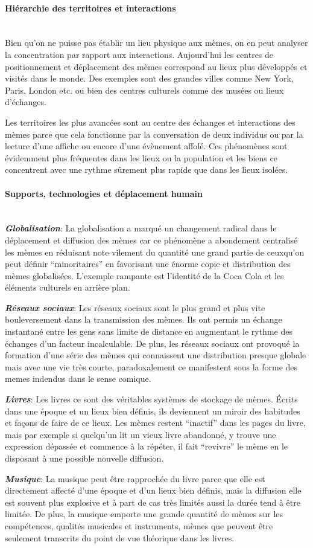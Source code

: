 \documentclass[12pt]{article}
\newcommand{\myparagraph}[1]{\paragraph{#1}\mbox{}\\}
\begin{document}
\myparagraph{Hiérarchie des territoires et interactions}
Bien qu'on ne puisse pas établir un lieu physique aux mèmes, on en peut
analyser la concentration par rapport aux interactions. Aujourd'hui les
centres de positionnement et déplacement des mèmes correspond au lieux
plus développés et visités dans le monde. Des exemples sont des grandes
villes comme New York, Paris, London etc. ou bien des centres culturels
comme des musées ou lieux d'échanges.

Les territoires les plus avancées sont au centre des échanges et
interactions des mèmes parce que cela fonctionne par la conversation de
deux individus ou par la lecture d'une affiche ou encore d'une évènement
affolé. Ces phénomènes sont évidemment plus fréquentes dans les lieux ou
la population et les biens ce concentrent avec une rythme sûrement plus
rapide que dans les lieux isolées.


\myparagraph{Supports, technologies et déplacement humain}

\emph{\textbf{Globalisation}}: La globalisation a marqué un changement
radical dans le déplacement et diffusion des mèmes car ce phénomène a
abondement centralisé les mèmes en réduisant note vilement du quantité
une grand partie de ceuxqu'on peut définir ``minoritaires'' en
favorisant une énorme copie et distribution des mèmes globalisées.
L'exemple rampante est l'identité de la Coca Cola et les éléments
culturels en arrière plan.

\emph{\textbf{Réseaux sociaux}}: Les réseaux sociaux sont le plus grand
et plus vite bouleversement dans la transmission des mèmes. Ils ont
permis un échange instantané entre les gens sans limite de distance en
augmentant le rythme des échanges d'un facteur incalculable. \cite{gach:tel-01037937} De plus,
les réseaux sociaux ont provoqué la formation d'une série des mèmes qui
connaissent une distribution presque globale mais avec une vie très
courte, paradoxalement ce manifestent sous la forme des memes indendus
dans le sense comique.

\emph{\textbf{Livres}}: Les livres ce sont des véritables systèmes de
stockage de mèmes. Écrits dans une époque et un lieux bien définis, ils
deviennent un miroir des habitudes et façons de faire de ce lieux. Les
mèmes restent ``inactif'' dans les pages du livre, mais par exemple si
quelqu'un lit un vieux livre abandonné, y trouve une expression dépassée
et commence à la répéter, il fait ``revivre'' le mème en le disposant à
une possible nouvelle diffusion. \cite{life}

\emph{\textbf{Musique}}: La musique peut être rapprochée du livre parce
que elle est directement affecté d'une époque et d'un lieux bien
définis, mais la diffusion elle est souvent plus explosive et à part de
cas très limités aussi la durée tend à être limitée. De plus, la musique
emporte une grande quantité de mèmes sur les compétences, qualités
musicales et instruments, mèmes que peuvent être seulement transcrits du
point de vue théorique dans les livres.
\end{document}
